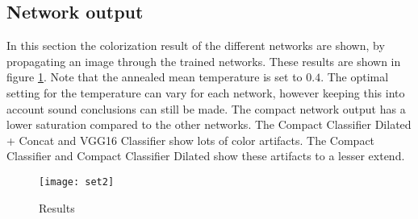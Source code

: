 \subsection{Network output}
In this section the colorization result of the different networks are shown, by propagating an image through the trained networks. These results are shown in figure \ref{fig:results}. Note that the annealed mean temperature is set to $0.4$. The optimal setting for the temperature can vary for each network, however keeping this into account sound conclusions can still be made. The compact network output has a lower saturation compared to the other networks. The Compact Classifier Dilated + Concat and VGG16 Classifier show lots of color artifacts. The Compact Classifier and Compact Classifier Dilated show these artifacts to a lesser extend.
\clearpage
\begin{figure}[h!]
	\centering
	\texttt{[image: set2]}
	\caption{Results}
	\label{fig:results}
\end{figure}



